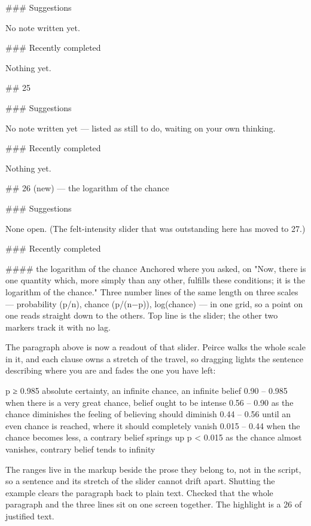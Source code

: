 ### Suggestions

No note written yet.

### Recently completed

Nothing yet.


## 25

### Suggestions

No note written yet — listed as still to do, waiting on your own thinking.

### Recently completed

Nothing yet.


## 26 (new) — the logarithm of the chance

### Suggestions

None open. (The felt-intensity slider that was outstanding here has moved to
27.)

### Recently completed

#### the logarithm of the chance
Anchored where you asked, on "Now, there is one quantity which, more simply than
any other, fulfills these conditions; it is the logarithm of the chance." Three
number lines of the same length on three scales — probability (p/n), chance
(p/(n−p)), log(chance) — in one grid, so a point on one reads straight down to
the others. Top line is the slider; the other two markers track it with no lag.

The paragraph above is now a readout of that slider. Peirce walks the whole
scale in it, and each clause owns a stretch of the travel, so dragging lights
the sentence describing where you are and fades the one you have left:

  p ≥ 0.985     absolute certainty, an infinite chance, an infinite belief
  0.90 – 0.985  when there is a very great chance, belief ought to be intense
  0.56 – 0.90   as the chance diminishes the feeling of believing should diminish
  0.44 – 0.56   until an even chance is reached, where it should completely vanish
  0.015 – 0.44  when the chance becomes less, a contrary belief springs up
  p < 0.015     as the chance almost vanishes, contrary belief tends to infinity

The ranges live in the markup beside the prose they belong to, not in the
script, so a sentence and its stretch of the slider cannot drift apart. Shutting
the example clears the paragraph back to plain text. Checked that the whole
paragraph and the three lines sit on one screen together. The highlight is a
26%
of justified text.

